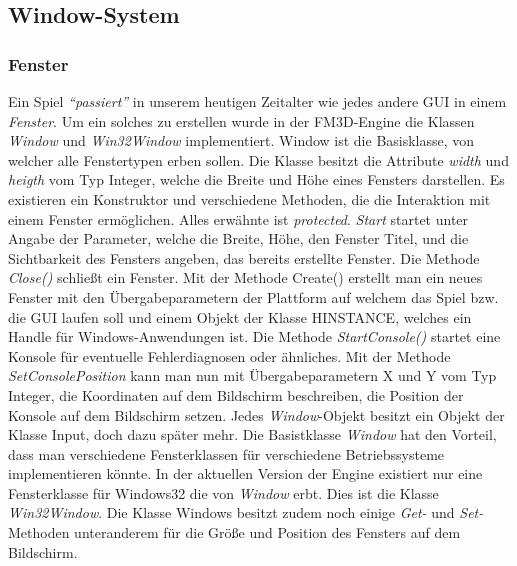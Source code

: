 \subsection{Window-System}

\subsubsection{Fenster}
Ein Spiel \textit{"`passiert"'} in unserem heutigen Zeitalter wie jedes andere GUI in einem \textit{Fenster}. Um ein solches zu erstellen wurde in der FM3D-Engine die Klassen \textit{Window} und \textit{Win32Window} implementiert.
Window ist die Basisklasse, von welcher alle Fenstertypen erben sollen.
Die Klasse besitzt die Attribute \textit{width} und \textit{heigth} vom Typ Integer, welche die Breite und Höhe eines Fensters darstellen.
Es existieren ein Konstruktor und verschiedene Methoden, die die Interaktion mit einem Fenster ermöglichen. Alles erwähnte ist \textit{protected}.
\textit{Start} startet unter Angabe der Parameter, welche die Breite, Höhe, den Fenster Titel, und die Sichtbarkeit des Fensters angeben, das bereits erstellte Fenster.
Die Methode \textit{Close()} schließt ein Fenster. Mit der Methode Create() erstellt man ein neues Fenster mit den Übergabeparametern der Plattform auf welchem das Spiel bzw. die GUI laufen soll und einem Objekt der Klasse HINSTANCE, welches ein Handle für Windows-Anwendungen ist. Die Methode \textit{StartConsole()} startet eine Konsole für eventuelle Fehlerdiagnosen oder ähnliches. Mit der Methode \textit{SetConsolePosition} kann man nun mit Übergabeparametern X und Y vom Typ Integer, die Koordinaten auf dem Bildschirm beschreiben, die Position der Konsole auf dem Bildschirm setzen.
Jedes \textit{Window}-Objekt besitzt ein Objekt der Klasse Input, doch dazu später mehr. Die Basistklasse \textit{Window} hat den Vorteil, dass man verschiedene Fensterklassen für verschiedene Betriebssysteme implementieren könnte. In der aktuellen Version der Engine existiert nur eine Fensterklasse für Windows32 die von \textit{Window} erbt. Dies ist die Klasse  \textit{Win32Window}. Die Klasse Windows besitzt zudem noch einige \textit{Get-} und \textit{Set-}Methoden unteranderem für die Größe und Position des Fensters auf dem Bildschirm.


